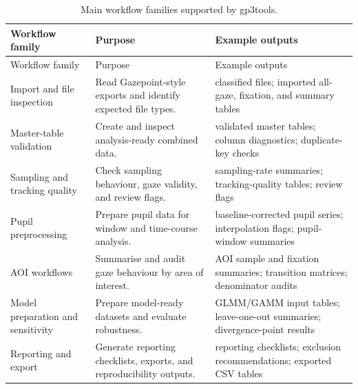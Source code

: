 \documentclass[
]{article}
\begin{document}
\begin{longtable}[]{@{}
  >{\raggedright\arraybackslash}p{}
  >{\raggedright\arraybackslash}p{}
  >{\raggedright\arraybackslash}p{}@{}}
\caption{Main workflow families supported by gp3tools.}\tabularnewline
\toprule\noalign{}
\begin{minipage}[b]{\linewidth}\raggedright
Workflow family
\end{minipage} & \begin{minipage}[b]{\linewidth}\raggedright
Purpose
\end{minipage} & \begin{minipage}[b]{\linewidth}\raggedright
Example outputs
\end{minipage} \\
\midrule\noalign{}
\endfirsthead
\toprule\noalign{}
\begin{minipage}[b]{\linewidth}\raggedright
Workflow family
\end{minipage} & \begin{minipage}[b]{\linewidth}\raggedright
Purpose
\end{minipage} & \begin{minipage}[b]{\linewidth}\raggedright
Example outputs
\end{minipage} \\
\midrule\noalign{}
\endhead
\bottomrule\noalign{}
\endlastfoot
Import and file inspection & Read Gazepoint-style exports and identify
expected file types. & classified files; imported all-gaze, fixation,
and summary tables \\
Master-table validation & Create and inspect analysis-ready combined
data. & validated master tables; column diagnostics; duplicate-key
checks \\
Sampling and tracking quality & Check sampling behaviour, gaze validity,
and review flags. & sampling-rate summaries; tracking-quality tables;
review flags \\
Pupil preprocessing & Prepare pupil data for window and time-course
analysis. & baseline-corrected pupil series; interpolation flags;
pupil-window summaries \\
AOI workflows & Summarise and audit gaze behaviour by area of interest.
& AOI sample and fixation summaries; transition matrices; denominator
audits \\
Model preparation and sensitivity & Prepare model-ready datasets and
evaluate robustness. & GLMM/GAMM input tables; leave-one-out summaries;
divergence-point results \\
Reporting and export & Generate reporting checklists, exports, and
reproducibility outputs. & reporting checklists; exclusion
recommendations; exported CSV tables \\
\end{longtable}
\end{document}
